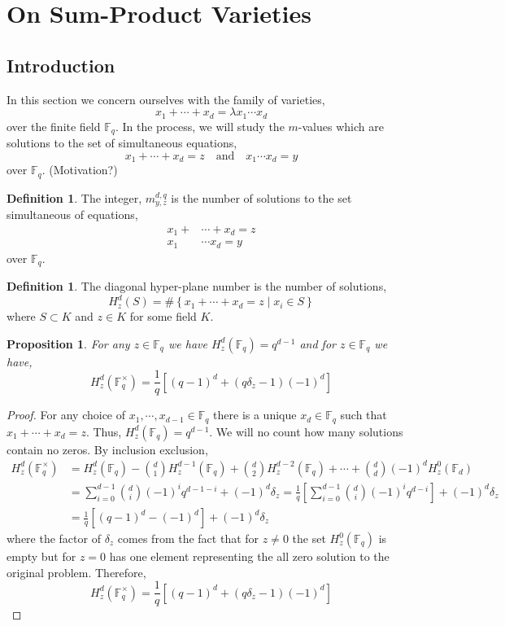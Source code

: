 \documentclass{article}
\newcommand{\finfield}[1]{\mathbb{F}_{#1}}
\newcommand{\finunits}[1]{\mathbb{F}_{#1}^\times}
\newtheorem{proposition}[theorem]{Proposition}
\theoremstyle{definition}
\theoremstyle{definition}
\newtheorem{definition}[theorem]{Definition}
\theoremstyle{remark}
\begin{document}
\section{On Sum-Product Varieties}

\subsection{Introduction}
 
In this section we concern ourselves with the family of varieties,
\[ x_1 + \cdots + x_d = \lambda x_1 \cdots x_d \]
over the finite field $\finfield{q}$. In the process, we will study the $m$-values which are solutions to the set of simultaneous equations,
\[ x_1 + \cdots + x_d = z \quad \text{and} \quad x_1 \cdots x_d = y \]
over $\finfield{q}$. (Motivation?)

\begin{definition}
The integer, $m^{d,q}_{y,z}$ is the number of solutions to the set simultaneous of equations,
\begin{align*}
x_1 + & \cdots + x_d = z \\
x_1  & \cdots x_d = y
\end{align*}
over $\finfield{q}$. 
\end{definition}

\begin{definition}
The diagonal hyper-plane number is the number of solutions, 
\[H^d_z(S) = \# \left\{ x_1 + \cdots + x_d = z \mid x_i \in S \right\} \]
where $S \subset K$ and $z \in K$ for some field $K$.
\end{definition}

\begin{proposition}
For any $z \in \finfield{q}$ we have $H^d_z(\finfield{q}) = q^{d-1}$ and for $z \in \finfield{q}$ we have, 
\[ H^d_z(\finunits{q}) = \frac{1}{q} \left[ (q-1)^d + (q \delta_z - 1)(-1)^d \right] \]
\end{proposition}

\begin{proof}
For any choice of $x_1, \cdots, x_{d-1} \in \finfield{q}$ there is a unique $x_d \in \finfield{q}$ such that $x_1 + \cdots + x_d = z$. Thus, $H^d_z(\finfield{q}) = q^{d-1}$. We will no count how many solutions contain no zeros. By inclusion exclusion, 
\begin{align*}
H^d_z(\finunits{q}) & = H^{d}_z(\finfield{q}) - {d \choose 1} H^{d-1}_z(\finfield{q}) + {d \choose 2} H^{d-2}_z(\finfield{q}) + \cdots + {d \choose d} (-1)^d H^0_z(\finfield{d}) 
\\
& = \sum_{i = 0}^{d-1} {d \choose i} (-1)^i q^{d-1 - i} + (-1)^d \delta_z = \frac{1}{q} \left[ \sum_{i = 0}^{d-1} {d \choose i} (-1)^i q^{d - i} \right]  + (-1)^d \delta_z 
\\
& = \frac{1}{q} \left[ (q-1)^d - (-1)^d \right] + (-1)^d \delta_z
\end{align*}
where the factor of $\delta_z$ comes from the fact that for $z \neq 0$ the set $H^0_z(\finfield{q})$ is empty but for $z = 0$ has one element representing the all zero solution to the original problem. 
Therefore,
\[ H^d_z(\finunits{q}) = \frac{1}{q} \left[ (q-1)^d + (q \delta_z - 1)(-1)^d \right] \]
\end{proof}
\end{document}
